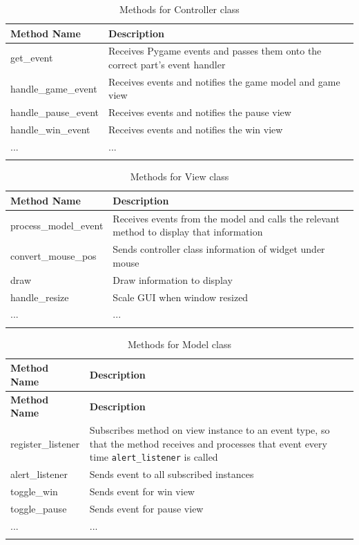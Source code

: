 \documentclass[../main/main.tex]{subfiles}
\begin{document}
\begin{longtable}[c]{l|p{}}
    \toprule
    \textbf{Method Name} & \textbf{Description}\\
    \midrule
    \endfirsthead
    \endhead

    get\_event & Receives Pygame events and passes them onto the correct part's event handler\\
    handle\_game\_event & Receives events and notifies the game model and game view\\
    handle\_pause\_event & Receives events and notifies the pause view\\
    handle\_win\_event & Receives events and notifies the win view\\
    ... & ...\\

    \bottomrule

\caption{Methods for Controller class}
\label{tab:controller-methods}
\end{longtable}

\begin{longtable}[c]{l|p{}}
    \toprule
    \textbf{Method Name} & \textbf{Description}\\
    \midrule
    \endfirsthead
    \endhead

    process\_model\_event & Receives events from the model and calls the relevant method to display that information\\
    convert\_mouse\_pos & Sends controller class information of widget under mouse\\
    draw & Draw information to display \\
    handle\_resize & Scale GUI when window resized\\
    ... & ...\\

    \bottomrule

\caption{Methods for View class}
\label{tab:view-methods}
\end{longtable}

\begin{longtable}[c]{l|p{}}
    \toprule
    \textbf{Method Name} & \textbf{Description}\\
    \midrule
    \endfirsthead
    \textbf{Method Name} & \textbf{Description}\\
    \midrule
    \endhead

    register\_listener & Subscribes method on view instance to an event type, so that the method receives and processes that event every time \lstinline[language=Python]{alert_listener} is called\\
    alert\_listener & Sends event to all subscribed instances\\
    toggle\_win & Sends event for win view\\
    toggle\_pause & Sends event for pause view\\
    ... & ...\\

    \bottomrule

\caption{Methods for Model class}
\label{tab:model-methods}
\end{longtable}
\end{document}

